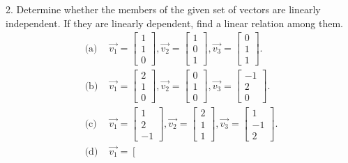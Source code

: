 \documentclass[11pt]{article}
\begin{document}
2. Determine whether the members of the given set of vectors
are linearly independent. If they are linearly dependent, find a linear relation among them. 
$$\begin{aligned}
\text{(a)  }& \overrightarrow{v_1} = \left[\begin{array}{c}
1\\ 1 \\0 
\end{array}\right], \overrightarrow{v_2} = \left[\begin{array}{c}
1\\ 0 \\1 
\end{array}\right], \overrightarrow{v_3} = \left[\begin{array}{c}
0\\ 1 \\1 
\end{array}\right]. \\
\text{(b)  }& \overrightarrow{v_1} = \left[\begin{array}{c}
2\\ 1 \\0 
\end{array}\right], \overrightarrow{v_2} = \left[\begin{array}{c}
0\\ 1 \\0 
\end{array}\right], \overrightarrow{v_3} = \left[\begin{array}{c}
-1\\ 2 \\0 
\end{array}\right]. \\
\text{(c)  }& \overrightarrow{v_1} = \left[\begin{array}{c}
1\\ 2 \\-1 
\end{array}\right], \overrightarrow{v_2} = \left[\begin{array}{c}
2\\ 1 \\1 
\end{array}\right], \overrightarrow{v_3} = \left[\begin{array}{c}
1\\ -1 \\2 
\end{array}\right]. \\
\text{(d)  }& \overrightarrow{v_1} = \left[\begin{array}{c}

\end{array}
\end{aligned}$$
\end{document}
